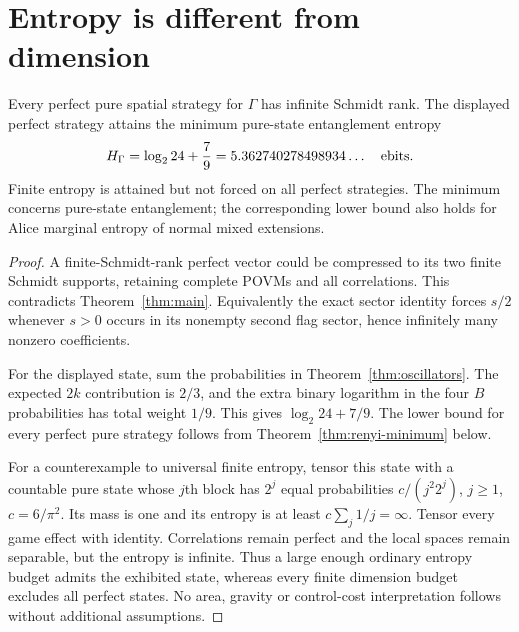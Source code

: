 \section{Entropy is different from dimension}\label{sec:entropy}
\begin{theorem}\label{thm:finite-entropy}
Every perfect pure spatial strategy for $\Gamma$ has infinite Schmidt rank. The displayed perfect strategy attains the minimum pure-state entanglement entropy
\[
 H_\Gamma=\log_2 24+\frac79=5.362740278498934\ldots\quad\hbox{ebits}.
\]
Finite entropy is attained but not forced on all perfect strategies. The minimum concerns pure-state entanglement; the corresponding lower bound also holds for Alice marginal entropy of normal mixed extensions.
\end{theorem}
\begin{proof}
A finite-Schmidt-rank perfect vector could be compressed to its two finite Schmidt supports, retaining complete POVMs and all correlations. This contradicts Theorem~\ref{thm:main}. Equivalently the exact sector identity forces $s/2$ whenever $s>0$ occurs in its nonempty second flag sector, hence infinitely many nonzero coefficients.

For the displayed state, sum the probabilities in Theorem~\ref{thm:oscillators}. The expected $2k$ contribution is $2/3$, and the extra binary logarithm in the four $B$ probabilities has total weight $1/9$. This gives $\log_2 24+7/9$. The lower bound for every perfect pure strategy follows from Theorem~\ref{thm:renyi-minimum} below.

For a counterexample to universal finite entropy, tensor this state with a countable pure state whose $j$th block has $2^j$ equal probabilities $c/(j^2 2^j)$, $j\ge1$, $c=6/\pi^2$. Its mass is one and its entropy is at least $c\sum_j1/j=\infty$. Tensor every game effect with identity. Correlations remain perfect and the local spaces remain separable, but the entropy is infinite. Thus a large enough ordinary entropy budget admits the exhibited state, whereas every finite dimension budget excludes all perfect states. No area, gravity or control-cost interpretation follows without additional assumptions.
\end{proof}



